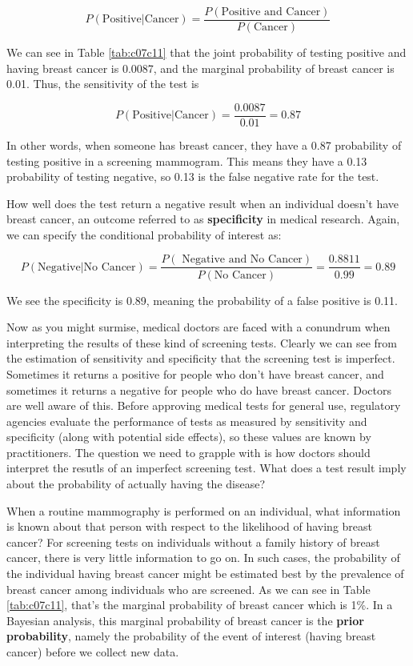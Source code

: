 \documentclass[
]{book}
\begin{document}
\[
P(\text{Positive}|\text{Cancer}) = \frac{P(\text{Positive and Cancer})}{P(\text{Cancer})}
\]

We can see in Table \ref{tab:c07c11} that the joint probability of
testing positive and having breast cancer is 0.0087, and the marginal
probability of breast cancer is 0.01. Thus, the sensitivity of the test
is

\[
P(\text{Positive}|\text{Cancer}) = \frac{0.0087}{0.01}=0.87
\]

In other words, when someone has breast cancer, they have a 0.87
probability of testing positive in a screening mammogram. This means
they have a 0.13 probability of testing negative, so 0.13 is the false
negative rate for the test.

How well does the test return a negative result when an individual
doesn't have breast cancer, an outcome referred to as \textbf{specificity} in
medical research. Again, we can specify the conditional probability of
interest as:

\[
P(\text{Negative}|\text{No Cancer}) = \frac{P(\text{ Negative and No Cancer})}{P(\text{No Cancer})} = \frac{0.8811}{0.99}=0.89
\]

We see the specificity is 0.89, meaning the probability of a false
positive is 0.11.

Now as you might surmise, medical doctors are faced with a conundrum
when interpreting the results of these kind of screening tests. Clearly
we can see from the estimation of sensitivity and specificity that the
screening test is imperfect. Sometimes it returns a positive for people
who don't have breast cancer, and sometimes it returns a negative for
people who do have breast cancer. Doctors are well aware of this. Before
approving medical tests for general use, regulatory agencies evaluate
the performance of tests as measured by sensitivity and specificity
(along with potential side effects), so these values are known by
practitioners. The question we need to grapple with is how doctors
should interpret the resutls of an imperfect screening test. What does a
test result imply about the probability of actually having the disease?

When a routine mammography is performed on an individual, what
information is known about that person with respect to the likelihood of
having breast cancer? For screening tests on individuals without a
family history of breast cancer, there is very little information to go
on. In such cases, the probability of the individual having breast
cancer might be estimated best by the prevalence of breast cancer among
individuals who are screened. As we can see in Table \ref{tab:c07c11},
that's the marginal probability of breast cancer which is 1\%. In a
Bayesian analysis, this marginal probability of breast cancer is the
\textbf{prior probability}, namely the probability of the event of interest
(having breast cancer) before we collect new data.
\end{document}
